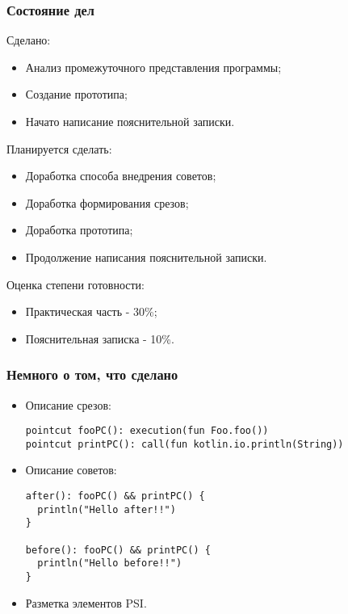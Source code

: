 \documentclass{beamer}
\begin{document}
	\begin{frame}
		\frametitle{Состояние дел}
        Сделано:
		\begin{itemize}
            \item Анализ промежуточного представления программы;
            \item Создание прототипа;
            \item Начато написание пояснительной записки.
        \end{itemize}

        Планируется сделать:
        \begin{itemize}
            \item Доработка способа внедрения советов;
            \item Доработка формирования срезов;
            \item Доработка прототипа;
            \item Продолжение написания пояснительной записки.
        \end{itemize}
        Оценка степени готовности:
        \begin{itemize}
            \item Практическая часть - 30\%;
            \item Пояснительная записка - 10\%.
        \end{itemize}
    \end{frame}

    \begin{frame}[fragile=singleslide]
    	\frametitle{Немного о том, что сделано}
    	\begin{itemize}
    		\item Описание срезов:
    			\begin{lstlisting}[frame=single,style=base]
pointcut fooPC(): execution(fun Foo.foo())
pointcut printPC(): call(fun kotlin.io.println(String))
    			\end{lstlisting}
    		\item Описание советов:
    			\begin{lstlisting}[frame=single,style=base]
after(): fooPC() && printPC() {
  println("Hello after!!")
}

before(): fooPC() && printPC() {
  println("Hello before!!")
}
    			\end{lstlisting}
    		\item Разметка элементов PSI.
    	\end{itemize}
    \end{frame}
\end{document}
